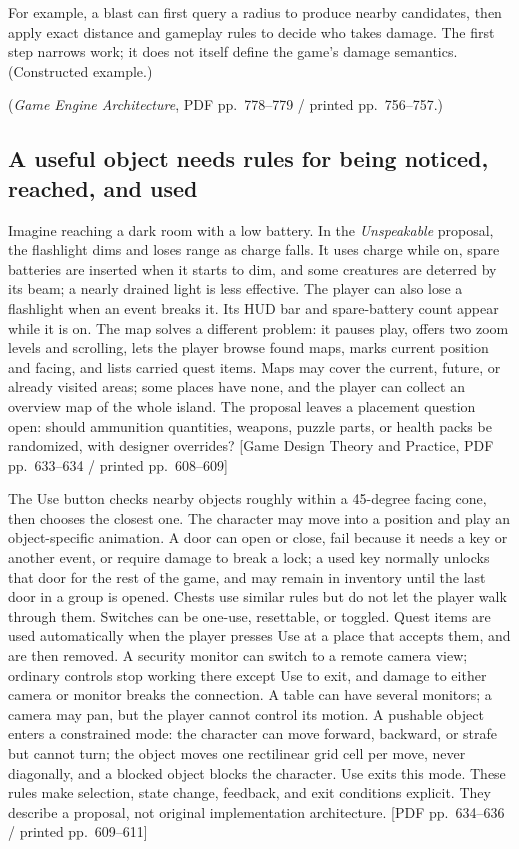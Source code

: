 For example, a blast can first query a radius to produce nearby candidates, then apply exact distance and gameplay rules to decide who takes damage. The first step narrows work; it does not itself define the game's damage semantics. (Constructed example.)

(\emph{Game Engine Architecture}, PDF pp.~778--779 / printed pp.~756--757.)

\subsection{A useful object needs rules for being noticed, reached, and used}\label{06-engine-ii-ch031-a-useful-object-needs-rules-for-being-noticed-reached-and-used}

Imagine reaching a dark room with a low battery. In the \emph{Unspeakable} proposal, the flashlight dims and loses range as charge falls. It uses charge while on, spare batteries are inserted when it starts to dim, and some creatures are deterred by its beam; a nearly drained light is less effective. The player can also lose a flashlight when an event breaks it. Its HUD bar and spare-battery count appear while it is on. The map solves a different problem: it pauses play, offers two zoom levels and scrolling, lets the player browse found maps, marks current position and facing, and lists carried quest items. Maps may cover the current, future, or already visited areas; some places have none, and the player can collect an overview map of the whole island. The proposal leaves a placement question open: should ammunition quantities, weapons, puzzle parts, or health packs be randomized, with designer overrides? {[}Game Design Theory and Practice, PDF pp.~633--634 / printed pp.~608--609{]}

The Use button checks nearby objects roughly within a 45-degree facing cone, then chooses the closest one. The character may move into a position and play an object-specific animation. A door can open or close, fail because it needs a key or another event, or require damage to break a lock; a used key normally unlocks that door for the rest of the game, and may remain in inventory until the last door in a group is opened. Chests use similar rules but do not let the player walk through them. Switches can be one-use, resettable, or toggled. Quest items are used automatically when the player presses Use at a place that accepts them, and are then removed. A security monitor can switch to a remote camera view; ordinary controls stop working there except Use to exit, and damage to either camera or monitor breaks the connection. A table can have several monitors; a camera may pan, but the player cannot control its motion. A pushable object enters a constrained mode: the character can move forward, backward, or strafe but cannot turn; the object moves one rectilinear grid cell per move, never diagonally, and a blocked object blocks the character. Use exits this mode. These rules make selection, state change, feedback, and exit conditions explicit. They describe a proposal, not original implementation architecture. {[}PDF pp.~634--636 / printed pp.~609--611{]}

